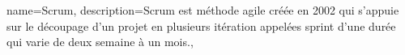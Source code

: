 \documentclass[a4paper,12pt,dvipsnames]{report}
\begin{document}




\tableofcontents
\listoffigures
\listoftables














{
	name={Scrum},
	description={Scrum est méthode agile créée en 2002 qui s'appuie sur le découpage d'un projet en plusieurs itération appelées sprint d'une durée qui varie de deux semaine à un mois.},
}

\glsaddall
\printglossaries


\nocite{*}
\cleardoublepage
{}
{}
\printbibliography
\end{document}
